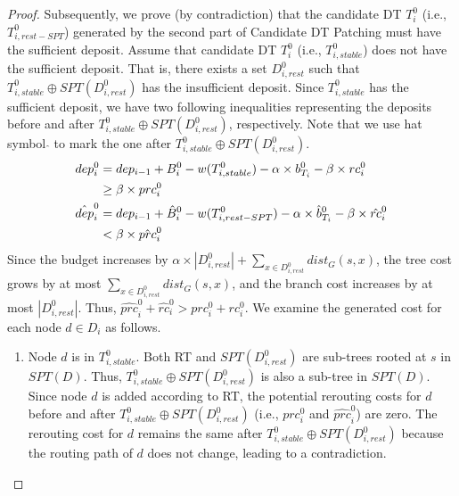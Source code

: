 \documentclass[10pt, conference, letterpaper]{IEEEtran}
\theoremstyle{definition}
\begin{document}
\begin{proof}
Subsequently, we prove (by contradiction) that the candidate DT $T_{i}^{0}$ (i.e., $T_{i,rest-SPT}^{0}$) generated by the second part of Candidate DT Patching must
have the sufficient deposit.
Assume that candidate DT $T_{i}^{0}$ (i.e., $T_{i,stable}^0$) does not 
have the sufficient deposit.
That is,
there exists a set $D_{i,rest}^0$ such that $T_{i,stable}^{0} \oplus SPT(D_{i,rest}^{0})$
has the insufficient deposit.
Since $T_{i,stable}^0$ 
has the sufficient deposit,
we have two following inequalities representing the deposits before and after $T_{i,stable}^{0} \oplus SPT(D_{i,rest}^{0})$, respectively.
Note that we use hat symbol $\hat{}$ to mark the one after $T_{i,stable}^{0} \oplus SPT(D_{i,rest}^{0})$.
\begin{align}
dep_i^{0} &= dep_{i-1}+B_i^{0} - w(T_{i,stable}^{0}) - \alpha \times b_{T_i}^{0} - \beta  \times rc_i^{0}\notag\\
&\geq \beta \times prc_i^{0} \label{inequality: dep before}\\
\hat{dep}_i^{0} &= dep_{i-1}+\hat{B}_i^{0} - w(T_{i,rest-SPT}^{0}) - \alpha \times \hat{b}_{T_i}^{0} - \beta  \times \hat{rc}_i^{0}\notag\\
&<\beta \times \hat{prc}_i^{0} \label{inequality: dep after}
\end{align}
Since the budget increases by $\alpha \times|D_{i,rest}^0|+\sum_{x\in D_{i,rest}^0}dist_G(s,x)$, the tree cost grows by at most $\sum_{x\in D_{i,rest}^0}dist_G(s,x)$, and the branch cost increases by at most $|D_{i,rest}^0|$.
Thus, $\hat{prc}_i^{0} + \hat{rc}_i^{0} > prc_i^{0} + rc_i^{0}$.
We examine the generated cost for each node $d\in D_i$ as follows.
\begin{enumerate}
\item Node $d$ is in $T_{i,stable}^{0}$.
Both RT and $SPT(D_{i,rest}^0)$ are sub-trees rooted at $s$ in $SPT(D)$. Thus, $T_{i,stable}^{0} \oplus SPT(D_{i,rest}^{0})$ is also a sub-tree in $SPT(D)$. Since node $d$ is added according to RT, the potential rerouting costs for $d$ before and after $T_{i,stable}^{0} \oplus SPT(D_{i,rest}^{0})$ (i.e., $prc_i^{0}$ and $\hat{prc}_i^{0}$) are zero. The rerouting cost for $d$ remains the same after $T_{i,stable}^{0} \oplus SPT(D_{i,rest}^{0})$ because the routing path of $d$ does not change, leading to a contradiction. 

\end{enumerate}
\end{proof}
\end{document}
